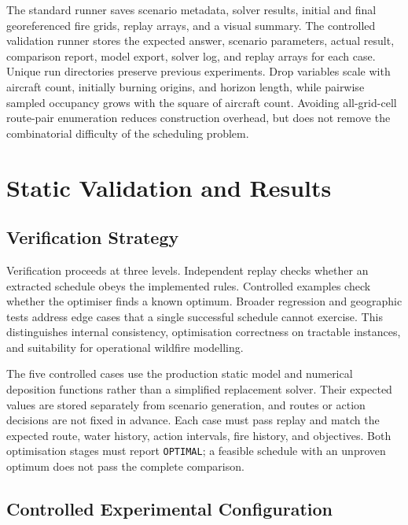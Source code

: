 The standard runner saves scenario metadata, solver results, initial and final georeferenced fire grids, replay arrays, and a visual summary. The controlled validation runner stores the expected answer, scenario parameters, actual result, comparison report, model export, solver log, and replay arrays for each case. Unique run directories preserve previous experiments. Drop variables scale with aircraft count, initially burning origins, and horizon length, while pairwise sampled occupancy grows with the square of aircraft count. Avoiding all-grid-cell route-pair enumeration reduces construction overhead, but does not remove the combinatorial difficulty of the scheduling problem.


\chapter{Static Validation and Results}
\label{ch:static-validation}

\section{Verification Strategy}
\label{sec:validation-strategy}

Verification proceeds at three levels. Independent replay checks whether an extracted schedule obeys the implemented rules. Controlled examples check whether the optimiser finds a known optimum. Broader regression and geographic tests address edge cases that a single successful schedule cannot exercise. This distinguishes internal consistency, optimisation correctness on tractable instances, and suitability for operational wildfire modelling.

The five controlled cases use the production static model and numerical deposition functions rather than a simplified replacement solver. Their expected values are stored separately from scenario generation, and routes or action decisions are not fixed in advance. Each case must pass replay and match the expected route, water history, action intervals, fire history, and objectives. Both optimisation stages must report \texttt{OPTIMAL}; a feasible schedule with an unproven optimum does not pass the complete comparison.

\section{Controlled Experimental Configuration}
\label{sec:validation-configuration}

